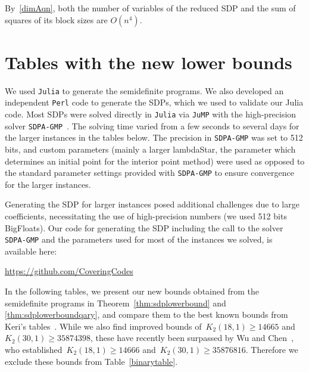 \documentclass[10pt,a4paper]{article}
\theoremstyle{definition}
\begin{document}
By~\eqref{dimAqn}, both the number of variables of the reduced SDP and the sum of squares of its block sizes are $O(n^4)$. 


\section{Tables with the new lower bounds\label{sec:tables}}

We used \texttt{Julia} to generate the semidefinite programs. We also developed an independent \texttt{Perl} code to generate the SDPs, which we used to validate our Julia code. Most SDPs were solved directly in \texttt{Julia} via \texttt{JuMP} with the high-precision solver \texttt{SDPA-GMP}~\cite{SDPAGMP}. The solving time varied from a few seconds to several days for the larger instances in the tables below. The precision in \texttt{SDPA-GMP} was set to 512 bits, and custom parameters (mainly a larger lambdaStar, the parameter which determines an initial point for the interior point method) were used as opposed to the standard parameter settings provided with \texttt{SDPA-GMP} to ensure convergence for the larger instances.

Generating the SDP for larger instances posed additional challenges due to large coefficients, necessitating the use of high-precision numbers (we used 512 bits BigFloats). Our code for generating the SDP including the call to the solver \texttt{SDPA-GMP} and the parameters used for most of the instances we solved, is available here:  
\begin{center}
\url{https://github.com/CoveringCodes}
\end{center}

In the following tables, we present our new bounds obtained from the semidefinite programs in Theorem~\ref{thm:sdplowerbound} and \ref{thm:sdplowerboundqary}, and compare them to the best known bounds from Keri's tables~\cite{KeriTables}. While we also find improved bounds of~$K_2(18,1) \geq 14665$ and~$K_2(30,1) \geq 35874398$, these have recently been surpassed by Wu and Chen~\cite{WuChen24}, who established~$K_2(18,1) \geq 14666$ and~$K_2(30,1) \geq 35876816$. Therefore we exclude these bounds from Table~\ref{binarytable}.
\end{document}
